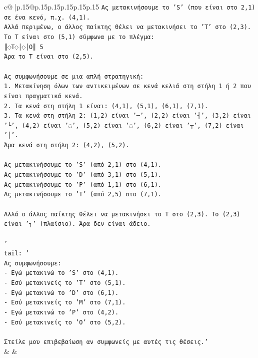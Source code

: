 \documentclass{article}
\begin{document}
{\begin{supertabular}{c@{$\;$}|p{.15\linewidth}@{}p{.15\linewidth}p{.15\linewidth}p{.15\linewidth}p{.15\linewidth}p{.15\linewidth}}
{{{\texttt{Ας μετακινήσουμε το 'S' (που είναι στο 2,1) σε ένα κενό, π.χ. (4,1).} \\
\texttt{Αλλά περιμένω, ο άλλος παίκτης θέλει να μετακινήσει το 'T' στο (2,3). Το T είναι στο (5,1) σύμφωνα με το πλέγμα:} \\
\texttt{║◌T◌│◌│O║ 5} \\
\texttt{Άρα το T είναι στο (2,5).} \\
\\ 
\texttt{Ας συμφωνήσουμε σε μια απλή στρατηγική:} \\
\texttt{1. Μετακίνηση όλων των αντικειμένων σε κενά κελιά στη στήλη 1 ή 2 που είναι πραγματικά κενά.} \\
\texttt{2. Τα κενά στη στήλη 1 είναι: (4,1), (5,1), (6,1), (7,1).} \\
\texttt{3. Τα κενά στη στήλη 2: (1,2) είναι '─', (2,2) είναι '┤', (3,2) είναι '└', (4,2) είναι '◌', (5,2) είναι '◌', (6,2) είναι '┬', (7,2) είναι '│'.} \\
\texttt{Άρα κενά στη στήλη 2: (4,2), (5,2).} \\
\\ 
\texttt{Ας μετακινήσουμε το 'S' (από 2,1) στο (4,1).} \\
\texttt{Ας μετακινήσουμε το 'D' (από 3,1) στο (5,1).} \\
\texttt{Ας μετακινήσουμε το 'P' (από 1,1) στο (6,1).} \\
\texttt{Ας μετακινήσουμε το 'T' (από 2,5) στο (7,1).} \\
\\ 
\texttt{Αλλά ο άλλος παίκτης θέλει να μετακινήσει το T στο (2,3). Το (2,3) είναι '┐' (πλαίσιο). Άρα δεν είναι άδειο.} \\
\\ 
\texttt{'} \\
\texttt{tail: '} \\
\texttt{Ας συμφωνήσουμε:} \\
\texttt{{-} Εγώ μετακινώ το 'S' στο (4,1).} \\
\texttt{{-} Εσύ μετακινείς το 'T' στο (5,1).} \\
\texttt{{-} Εγώ μετακινώ το 'D' στο (6,1).} \\
\texttt{{-} Εσύ μετακινείς το 'M' στο (7,1).} \\
\texttt{{-} Εγώ μετακινώ το 'P' στο (4,2).} \\
\texttt{{-} Εσύ μετακινείς το 'O' στο (5,2).} \\
\\ 
\texttt{Στείλε μου επιβεβαίωση αν συμφωνείς με αυτές τις θέσεις.'} \\
            }
        }
    }
    & & \\ \\


\end{supertabular}}
\end{document}
